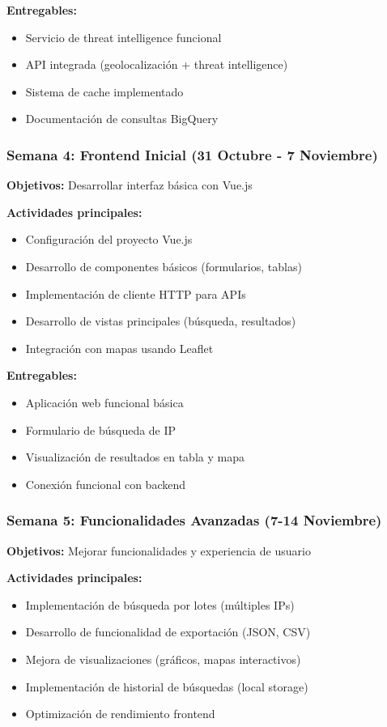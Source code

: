 \textbf{Entregables:}
\begin{itemize}
    \item Servicio de threat intelligence funcional
    \item API integrada (geolocalización + threat intelligence)
    \item Sistema de cache implementado
    \item Documentación de consultas BigQuery
\end{itemize}

\subsubsection{Semana 4: Frontend Inicial (31 Octubre - 7 Noviembre)}
\textbf{Objetivos:} Desarrollar interfaz básica con Vue.js

\textbf{Actividades principales:}
\begin{itemize}
    \item Configuración del proyecto Vue.js
    \item Desarrollo de componentes básicos (formularios, tablas)
    \item Implementación de cliente HTTP para APIs
    \item Desarrollo de vistas principales (búsqueda, resultados)
    \item Integración con mapas usando Leaflet
\end{itemize}

\textbf{Entregables:}
\begin{itemize}
    \item Aplicación web funcional básica
    \item Formulario de búsqueda de IP
    \item Visualización de resultados en tabla y mapa
    \item Conexión funcional con backend
\end{itemize}

\subsubsection{Semana 5: Funcionalidades Avanzadas (7-14 Noviembre)}
\textbf{Objetivos:} Mejorar funcionalidades y experiencia de usuario

\textbf{Actividades principales:}
\begin{itemize}
    \item Implementación de búsqueda por lotes (múltiples IPs)
    \item Desarrollo de funcionalidad de exportación (JSON, CSV)
    \item Mejora de visualizaciones (gráficos, mapas interactivos)
    \item Implementación de historial de búsquedas (local storage)
    \item Optimización de rendimiento frontend
\end{itemize}

